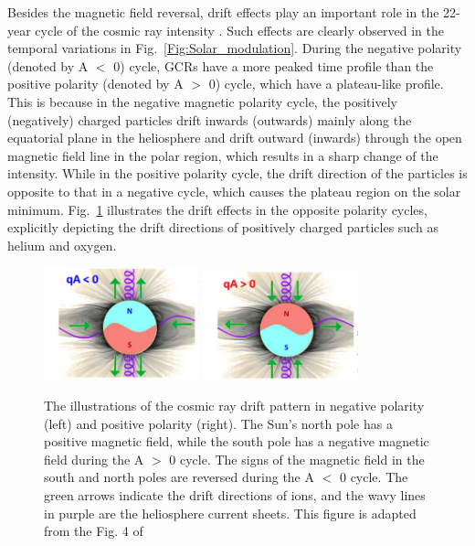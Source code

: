 Besides the magnetic field reversal, drift effects play an important role in the 22-year cycle of the cosmic ray intensity \citep{Jokipii1977ApJ}. Such effects are clearly observed in the temporal variations in Fig.~\ref{Fig:Solar_modulation}.
During the negative polarity (denoted by A $<$ 0) cycle, \acp{GCR} have a more peaked time profile than the positive polarity (denoted by A $>$ 0) cycle, which have a plateau-like profile. 
This is because in the negative magnetic polarity cycle, the positively (negatively) charged particles drift inwards (outwards) mainly along the equatorial plane in the heliosphere and drift outward (inwards) through the open magnetic field line in the polar region, which results in a sharp change of the intensity. While in the positive polarity cycle, the drift direction of the particles is opposite to that in a negative cycle, which causes the plateau region on the solar minimum. Fig.~\ref{Fig:drift_effect} illustrates the drift effects in the opposite polarity cycles, explicitly depicting the drift directions of positively charged particles such as helium and oxygen.

\begin{figure}
    \centering
    \includegraphics[width = 0.4\textwidth]{images/drift_effect.png}
    \includegraphics[width = 0.4\textwidth]{images/drift_effect_2.png}
    \caption[The global drift pattern of positively charged particles in different polarity]{The illustrations of the cosmic ray drift pattern in negative polarity (left) and positive polarity (right). The Sun's north pole has a positive magnetic field, while the south pole has a negative magnetic field during the A $>$ 0 cycle. The signs of the magnetic field in the south and north poles are reversed during the A $<$ 0 cycle. The green arrows indicate the drift directions of ions, and the wavy lines in purple are the heliosphere current sheets. This figure is adapted from the Fig. 4 of \citet{Rankin2022ApJ}}
    \label{Fig:drift_effect}    
\end{figure}

